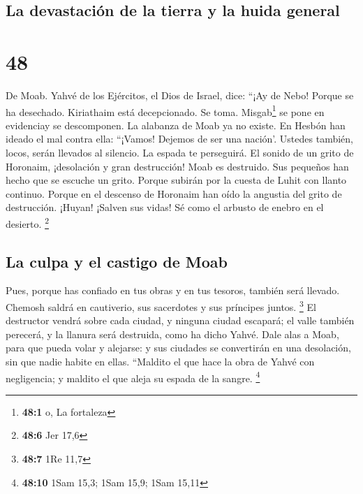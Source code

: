 \hypertarget{la-devastaciuxf3n-de-la-tierra-y-la-huida-general}{%
\subsection{La devastación de la tierra y la huida
general}\label{la-devastaciuxf3n-de-la-tierra-y-la-huida-general}}

\hypertarget{section-47}{%
\section{48}\label{section-47}}

 De Moab. Yahvé de los Ejércitos, el Dios de Israel, dice:
``¡Ay de Nebo! Porque se ha desechado. Kiriathaim está decepcionado. Se
toma. Misgab\footnote{\textbf{48:1} o, La fortaleza} se pone en
evidenciay se descomponen.  La alabanza de Moab ya no
existe. En Hesbón han ideado el mal contra ella: ``¡Vamos! Dejemos de
ser una nación'. Ustedes también, locos, serán llevados al silencio. La
espada te perseguirá.  El sonido de un grito de Horonaim,
¡desolación y gran destrucción!  Moab es destruido. Sus
pequeños han hecho que se escuche un grito.  Porque
subirán por la cuesta de Luhit con llanto continuo. Porque en el
descenso de Horonaim han oído la angustia del grito de destrucción.
 ¡Huyan! ¡Salven sus vidas! Sé como el arbusto de enebro
en el desierto. \footnote{\textbf{48:6} Jer 17,6}

\hypertarget{la-culpa-y-el-castigo-de-moab}{%
\subsection{La culpa y el castigo de
Moab}\label{la-culpa-y-el-castigo-de-moab}}

 Pues, porque has confiado en tus obras y en tus tesoros,
también será llevado. Chemosh saldrá en cautiverio, sus sacerdotes y sus
príncipes juntos. \footnote{\textbf{48:7} 1Re 11,7}  El
destructor vendrá sobre cada ciudad, y ninguna ciudad escapará; el valle
también perecerá, y la llanura será destruida, como ha dicho Yahvé.
 Dale alas a Moab, para que pueda volar y alejarse: y sus
ciudades se convertirán en una desolación, sin que nadie habite en
ellas.  ``Maldito el que hace la obra de Yahvé con
negligencia; y maldito el que aleja su espada de la sangre. \footnote{\textbf{48:10}
  1Sam 15,3; 1Sam 15,9; 1Sam 15,11}

